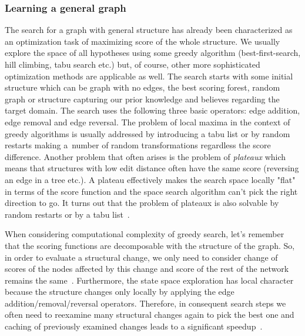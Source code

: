 \documentclass[english,cover]{fitthesis} %
\newcommand{\term}[1]{\emph{#1}}           %
\begin{document}
\subsubsection{Learning a general graph}
The search for a graph with general structure has already been characterized as an optimization task of maximizing score of the whole structure. We usually explore the space of all hypotheses using some greedy algorithm (best-first-search, hill climbing, tabu search etc.) but, of course, other more sophisticated optimization methods are applicable as well. The search starts with some initial structure which can be graph with no edges, the best scoring forest, random graph or structure capturing our prior knowledge and believes regarding the target domain. The search uses the following three basic operators: edge addition, edge removal and edge reversal. The problem of local maxima in the context of greedy algorithms is usually addressed by introducing a tabu list or by random restarts making a~number of random transformations regardless the score difference. Another problem that often arises is the problem of \term{plateaux} which means that structures with low edit distance often have the same score (reversing an edge in a tree etc.). A plateau effectively makes the search space locally "flat" in terms of the score function and the space search algorithm can't pick the right direction to go. It turns out that the problem of plateaux is also solvable by random restarts or by a tabu list~\cite[p.~815]{pgm}.

When considering computational complexity of greedy search, let's remember that the scoring functions are decomposable with the structure of the graph. So, in order to evaluate a structural change, we only need to consider change of scores of the nodes affected by this change and score of the rest of the network remains the same~\cite[p.~818]{pgm}. Furthermore, the state space exploration has local character because the structure changes only locally by applying the edge addition/removal/reversal operators. Therefore, in consequent search steps we often need to reexamine many structural changes again to pick the best one and caching of previously examined changes leads to a significant speedup~\cite[p.~819]{pgm}.
\end{document}
